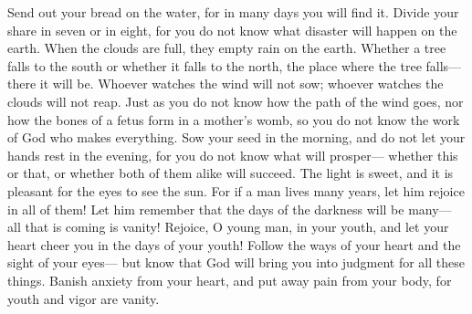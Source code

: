 \begin{biblechapter} %
 Send out your bread on the water, 
for in many days you will find it.
\verse Divide your share in seven or in eight, 
for you do not know what disaster will happen on the earth.
\verse When the clouds are full, 
they empty rain on the earth. 
Whether a tree falls to the south or whether it falls to the north, 
the place where the tree falls—there it will be.
\verse Whoever watches the wind will not sow; 
whoever watches the clouds will not reap.
\verse Just as you do not know how the path of the wind goes, 
nor how the bones of a fetus form in a mother’s womb, 
so you do not know the work of God who makes everything.
\verse Sow your seed in the morning, 
and do not let your hands rest in the evening, 
for you do not know what will prosper— 
whether this or that, or whether both of them alike will succeed.
 The light is sweet, 
and it is pleasant for the eyes to see the sun.
\verse For if a man lives many years, 
let him rejoice in all of them! 
Let him remember that the days of the darkness will be many— 
all that is coming is vanity!
\verse Rejoice, O young man, in your youth, 
and let your heart cheer you in the days of your youth! 
Follow the ways of your heart and the sight of your eyes— 
but know that God will bring you into judgment for all these things.
\verse Banish anxiety from your heart, 
and put away pain from your body, 
for youth and vigor are vanity.
\end{biblechapter}

